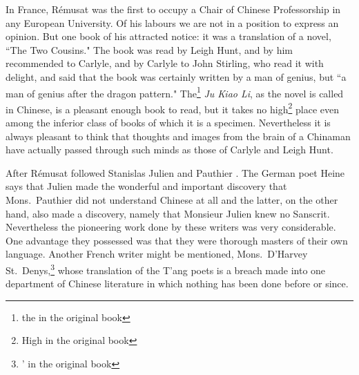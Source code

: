 In France, R\'emusat   was the first to occupy a Chair of Chinese Professorship in any European University.
Of his labours we are not in a position to express an opinion.
But one book of his attracted notice: it was a translation of a novel, ``The Two Cousins."
The book was read by Leigh Hunt, and by him recommended to Carlyle, and by Carlyle to John Stirling, who read it with delight, and said that the book was certainly written by a man of genius, but ``a man of genius after the dragon pattern."
The\footnote{the in the original book} \emph{Ju Kiao Li}, as the novel is called in Chinese, is a pleasant enough book to read, but it takes no high\footnote{High in the original book} place even among the inferior class of books of which it is a specimen.
Nevertheless it is always pleasant to think that thoughts and images from the brain of a Chinaman have actually passed through such minds as those of Carlyle and Leigh Hunt.

After R\'emusat followed Stanislas Julien  and Pauthier .
The German poet Heine says that Julien made the wonderful and important discovery that Mons.~Pauthier  did not understand Chinese at all and the latter, on the other hand, also made a discovery, namely that Monsieur Julien knew no Sanscrit. 
Nevertheless the pioneering work done by these writers was very considerable.
One advantage they possessed was that they were thorough masters of their own language.
Another French writer might be mentioned, Mons.~D'Harvey St.~Denys,\footnote{' in the original book}   whose translation of the T'ang poets is a breach made into one department of Chinese literature in which nothing has been done before or since.

